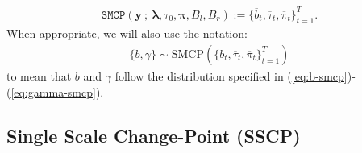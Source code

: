 \begin{align}\label{eq:smcp}
    \texttt{SMCP}\left(\mathbf{y} \:;\: \pmb{\lambda}, \tau_0, \pmb{\pi}, B_l,B_r\right) := \{\overline{b}_t, \overline{\tau}_t, \overline{\pi}_t\}_{t=1}^T.
\end{align}
When appropriate, we will also use the notation:
\begin{align}
    \{b,\gamma\} \sim \text{SMCP}(\{\overline{b}_t, \overline{\tau}_t, \overline{\pi}_t\}_{t=1}^T)
\end{align}
to mean that $b$ and $\gamma$ follow the distribution specified in (\ref{eq:b-smcp})-(\ref{eq:gamma-smcp}).

\subsection{Single Scale Change-Point (SSCP)}
\label{sec:sscp}

